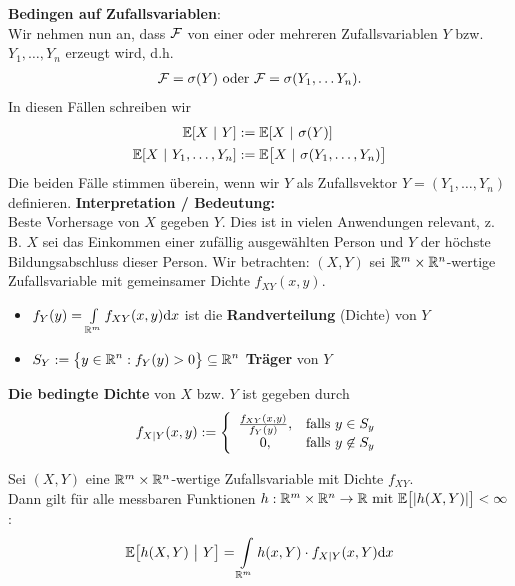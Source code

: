 \textbf{Bedingen auf Zufallsvariablen}:\\
Wir nehmen nun an, dass $\mathcal{F}$ von einer oder mehreren Zufallsvariablen $Y$ bzw. $Y_1,\ldots, Y_n$ erzeugt wird, d.h.
\begin{align*}
	\mathcal{F}=\sigma(Y)\text{ oder }\mathcal{F}=\sigma(Y_1,\ldots Y_n).
\end{align*}
In diesen Fällen schreiben wir 
\begin{align*}
	\mathbb{E}[X~|~Y]&:=\mathbb{E}[X~|~\sigma(Y)]\\
	\mathbb{E}[X~|~Y_1,\ldots,Y_n]&:=\mathbb{E}\big[X~|~\sigma(Y_1,\ldots,Y_n)\big]
\end{align*}
Die beiden Fälle stimmen überein, wenn wir $Y$ als Zufallsvektor $Y=(Y_1,\ldots,Y_n)$ definieren.\nl
\textbf{Interpretation / Bedeutung:}\\
Beste Vorhersage von $X$ gegeben $Y$. Dies ist in vielen Anwendungen relevant, z. B. $X$ sei das Einkommen einer zufällig ausgewählten Person und $Y$ der höchste Bildungsabschluss dieser Person.\nl
Wir betrachten: $(X,Y)$ sei $\mathbb{R}^m\times\mathbb{R}^n$-wertige Zufallsvariable mit gemeinsamer Dichte $f_{XY}(x,y)$.
\begin{itemize}
	\item
	$ f_Y(y)=\int\limits_{\mathbb{R}^m}f_{XY}(x,y)\mathrm{d} x $ ist die \textbf{Randverteilung} (Dichte) von $Y$
	\item 
	$\begin{aligned}
		S_Y:=\big\lbrace y\in\mathbb{R}^n:f_Y(y)>0\big\rbrace\subseteq\mathbb{R}^n
	\end{aligned}$ \textbf{Träger} von $Y$
\end{itemize}

\begin{defi} %
	\textbf{Die bedingte Dichte} von $X$ bzw. $Y$ ist gegeben durch 
	\begin{align*}
		f_{X|Y}(x,y):=\left\lbrace\begin{array}{cl}
			\frac{f_{XY}(x,y)}{f_Y(y)}, &\text{falls } y\in S_y\\
			0, &\text{falls } y\not\in S_y
		\end{array}\right.
	\end{align*}
\end{defi}

\begin{theorem} %
	Sei $(X,Y)$ eine $\mathbb{R}^m\times\mathbb{R}^n$-wertige Zufallsvariable mit Dichte $f_{XY}$.\\
	Dann gilt für alle messbaren Funktionen $h:\mathbb{R}^m\times\mathbb{R}^n\to\mathbb{R}\text{ mit }\mathbb{E}\big[|h(X,Y)|\big]<\infty$:
	\begin{align*}
		\mathbb{E}\big[ h(X,Y)~\big|~Y\big]=\int\limits_{\mathbb{R}^m} h(x,Y)\cdot f_{X|Y}(x,Y)\mathrm{d} x
	\end{align*}
\end{theorem}

